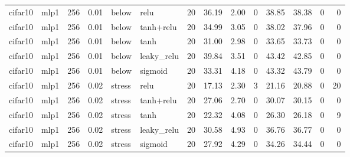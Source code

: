\begin{table}[htbp]
{\begin{tabular}{@{}llrrllrrrrrrrr@{}}
cifar10 & mlp1 & 256 & 0.01 & below & relu & 20 & 36.19 & 2.00 & 0 & 38.85 & 38.38 & 0 & 0 \\
cifar10 & mlp1 & 256 & 0.01 & below & tanh+relu & 20 & 34.99 & 3.05 & 0 & 38.02 & 37.96 & 0 & 0 \\
cifar10 & mlp1 & 256 & 0.01 & below & tanh & 20 & 31.00 & 2.98 & 0 & 33.65 & 33.73 & 0 & 0 \\
cifar10 & mlp1 & 256 & 0.01 & below & leaky\_relu & 20 & 39.84 & 3.51 & 0 & 43.42 & 42.85 & 0 & 0 \\
cifar10 & mlp1 & 256 & 0.01 & below & sigmoid & 20 & 33.31 & 4.18 & 0 & 43.32 & 43.79 & 0 & 0 \\
cifar10 & mlp1 & 256 & 0.02 & stress & relu & 20 & 17.13 & 2.30 & 3 & 21.16 & 20.88 & 0 & 20 \\
cifar10 & mlp1 & 256 & 0.02 & stress & tanh+relu & 20 & 27.06 & 2.70 & 0 & 30.07 & 30.15 & 0 & 0 \\
cifar10 & mlp1 & 256 & 0.02 & stress & tanh & 20 & 22.32 & 4.08 & 0 & 26.30 & 26.18 & 0 & 9 \\
cifar10 & mlp1 & 256 & 0.02 & stress & leaky\_relu & 20 & 30.58 & 4.93 & 0 & 36.76 & 36.77 & 0 & 0 \\
cifar10 & mlp1 & 256 & 0.02 & stress & sigmoid & 20 & 27.92 & 4.29 & 0 & 34.26 & 34.44 & 0 & 0 \\
\bottomrule
\end{tabular}}
\end{table}
